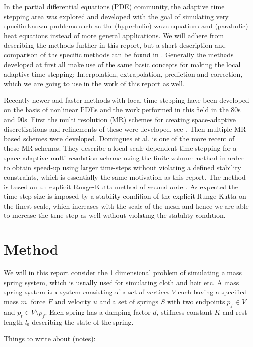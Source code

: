 \documentclass[11pt,a4paper]{article}
\begin{document}
In the partial differential equations (PDE) community, the adaptive time
stepping area was explored and developed with the goal of simulating
very specific known problems such as the (hyperbolic) wave equations
and (parabolic) heat equations instead of more general applications. We
will adhere from describing the methods further in this report, but a
short description and comparison of the specific methods can be found in
\cite{Gander:2013}. Generally the methods developed at first all make use
of the same basic concepts for making the local adaptive time stepping:
Interpolation, extrapolation, prediction and correction, which we are going to
use in the work of this report as well.

Recently newer and faster methods with local time stepping have been developed
on the basis of nonlinear PDEs and the work performed in this field in
the 80s and 90s. First the multi resolution (MR) schemes for creating
space-adaptive discretizations and refinements of these were developed, see
\cite{Berger:1984}. Then multiple MR based schemes were developed. Domingues
et al. \cite{Domingues:2008} is one of the more recent of these MR schemes.
They describe a local scale-dependent time stepping for a space-adaptive multi
resolution scheme using the finite volume method in order to obtain speed-up
using larger time-steps without violating a defined stability constraints,
which is essentially the same motivation as this report. The method is based
on an explicit Runge-Kutta method of second order. As expected the time step
size is imposed by a stability condition of the explicit Runge-Kutta on the
finest scale, which increases with the scale of the mesh and hence we are able
to increase the time step as well without violating the stability condition.

\section{Method}
We will in this report consider the 1 dimensional problem of simulating a mass
spring system, which is usually used for simulating cloth and hair etc. A mass
spring system is a system consisting of a set of vertices $V$ each having a
specified mass $m$, force $F$ and velocity $u$ and a set of springs $S$ with two
endpoints $p_f \in V$ and $p_t \in V \setminus p_f$. Each spring has a damping
factor $d$, stiffness constant $K$ and rest length $l_0$ describing the state of
the spring.

Things to write about (notes):
\end{document}
